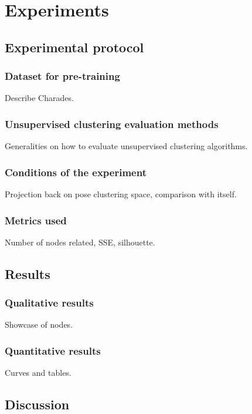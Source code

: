 \chapter{Experiments}
\label{chap:experiments}

\section{Experimental protocol}
\subsection{Dataset for pre-training}
Describe Charades.

\subsection{Unsupervised clustering evaluation methods}
Generalities on how to evaluate unsupervised clustering algorithms.
\subsection{Conditions of the experiment}
Projection back on pose clustering space, comparison with itself.

\subsection{Metrics used}
Number of nodes related, SSE, silhouette.

\section{Results}
\subsection{Qualitative results}
Showcase of nodes.
\subsection{Quantitative results}
Curves and tables.

\section{Discussion}
